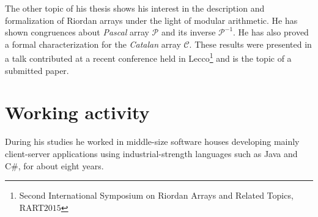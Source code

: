 \documentclass[10pt,a4paper]{scrartcl}
\begin{document}
    The other topic of his thesis shows his interest in the description and formalization of Riordan
    arrays under the light of modular arithmetic. He has shown congruences
    about \emph{Pascal} array $\mathcal{P}$ and its inverse $\mathcal{P}^{-1}$. He
    has also proved a formal characterization for the \emph{Catalan} array
    $\mathcal{C}$. These results were presented in a talk contributed at a recent
    conference held in Lecco\footnote{Second International Symposium on Riordan
    Arrays and Related Topics, RART$2015$} and is the topic of a submitted paper.

    \section{Working activity}

    During his studies he worked in middle-size software houses developing mainly client-server
    applications using industrial-strength languages such as Java and C\#, for about eight years.
        
\end{document}

